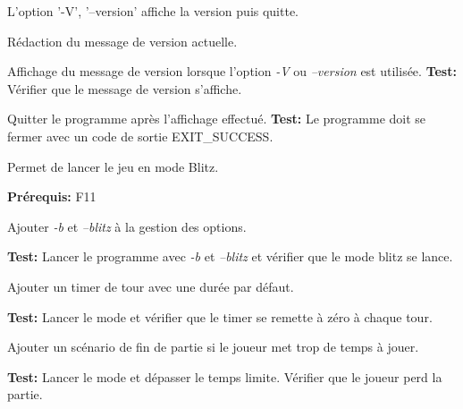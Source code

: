 \documentclass{article}
\begin{document}
\begin{needbox}[F17: Version]
    L'option '-V', '--version' affiche la version puis quitte.
    \begin{subneedbox}[F17.1: Texte]
        Rédaction du message de version actuelle.
    \end{subneedbox}
    \begin{subneedbox}[F17.2: Affichage]
        Affichage du message de version lorsque l'option \textit{-V} ou \textit{--version} est utilisée.
        \textbf{Test:} Vérifier que le message de version s'affiche.
    \end{subneedbox}
    \begin{subneedbox}[F17.3: Quitter]
        Quitter le programme après l'affichage effectué.
        \textbf{Test:} Le programme doit se fermer avec un code de sortie EXIT\_SUCCESS.
    \end{subneedbox}
    
\end{needbox}

\begin{needbox}
    Permet de lancer le jeu en mode Blitz.

    \textbf{Prérequis:} F11
    \begin{subneedbox}
        Ajouter \textit{-b} et \textit{--blitz} à la gestion des options.

        \textbf{Test:} Lancer le programme avec \textit{-b} et \textit{--blitz} et vérifier que le mode blitz se lance.
    \end{subneedbox}
    \begin{subneedbox}
        Ajouter un timer de tour avec une durée par défaut.

        \textbf{Test:} Lancer le mode et vérifier que le timer se remette à zéro à chaque tour.
    \end{subneedbox}
    \begin{subneedbox}
        Ajouter un scénario de fin de partie si le joueur met trop de temps à jouer.

        \textbf{Test:} Lancer le mode et dépasser le temps limite. Vérifier que le joueur perd la partie.
    \end{subneedbox}
\end{needbox}
\end{document}
